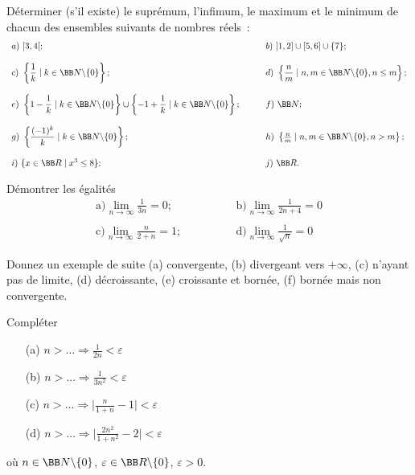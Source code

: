 \documentclass[12pt,french,oneside,a4paper]{memoir} %
\begin{document}
\begin{exo}
Déterminer (s'il existe) le suprémum, l'infimum, le maximum et le 
minimum de chacun des ensembles suivants de nombres réels~:
\begin{equation*}
\begin{array}{ll}
a)~[3,4[; &b)~]1,2] \cup [5,6] \cup \{7\}; \\
& \\
c)~\left\{\dfrac{1}{k} \mid k \in {\BB N} \backslash \{ 0 \} \right\}; 
&d)~\left\{ \dfrac{n}{m} \mid n,m \in {\BB N} \backslash \{0\}, n \leq m \right\}; \\
& \\
e)~\left\{1- \dfrac{1}{k} \mid k \in {\BB N} \backslash \{ 0 \} \right\} \cup \left\{ -1+ \dfrac{1}{k} \mid k \in {\BB N} \backslash \{ 0 \} \right\}; \qquad
&f)~ {\BB N}; \\
& \\
g)~\left\{ \dfrac{(-1)^k}{k} \mid k \in {\BB N} \backslash \{0\} \right\}; 
&h)~\left\{ \frac{n}{m} \mid n,m \in {\BB N} \backslash \{0\}, n>m \right\}; \\
& \\
i)~\{x \in {\BB R} \mid x^3 \leq 8 \}; &j)~\BB R.
\end{array}
\end{equation*}
\end{exo}
\begin{exo}
Démontrer les égalités
\begin{equation*}
\begin{array}{ll}
\mbox{a)} \lim_{n \rightarrow \infty} \frac{1}{3n}=0; \qquad \qquad
&\mbox{b)} \lim_{n \rightarrow \infty} \frac{1}{2n+4}=0 \\
& \\
\mbox{c)} \lim_{n \rightarrow \infty} \frac{n}{2+n}=1; \qquad \qquad
&\mbox{d)} \lim_{n \rightarrow \infty} \frac{1}{\sqrt{n}}=0
\end{array}
\end{equation*}
\end{exo}
\begin{exo}
Donnez un exemple de suite (a) convergente, (b) divergeant vers $+\infty$, 
(c) n'ayant pas de limite, (d) décroissante, (e) croissante et bornée, 
(f) bornée mais non convergente.
\end{exo}
\begin{exo}
Compléter
\begin{enumerate}
\item[(a)] $n > \ldots \Longrightarrow \frac{1}{2n} < \varepsilon$ 
\item[(b)] $n > \ldots \Longrightarrow \frac{1}{3n^2} < \varepsilon$ 
\item[(c)] $n > \ldots \Longrightarrow \vert \frac{n}{1+n}-1 \vert < \varepsilon$ 
\item[(d)] $n > \ldots \Longrightarrow \vert \frac{2n^2}{1+n^2}-2 \vert < \varepsilon$ 
\end{enumerate}
où $n \in {\BB N} \backslash \{0\}$, $\varepsilon \in {\BB R} \backslash \{0\}$, 
$\varepsilon > 0$.
\end{exo}
\end{document}
